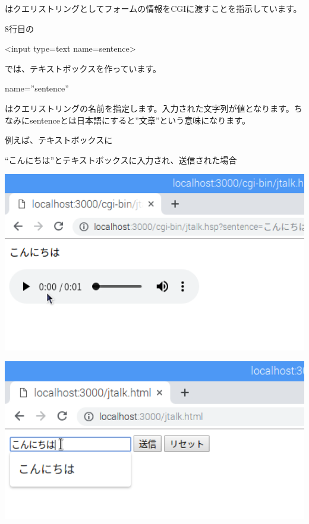 \documentclass[a4paper,12pt,dvipdfmx]{jarticle}
\begin{document}
はクエリストリングとしてフォームの情報をCGIに渡すことを指示しています。

8行目の

{\textless}input type={\textquotedbl}text{\textquotedbl} name={\textquotedbl}sentence{\textquotedbl}{\textgreater}

では、テキストボックスを作っています。

name=”sentence”

はクエリストリングの名前を指定します。入力された文字列が値となります。ちなみにsentenceとは日本語にすると”文章”という意味になります。

例えば、テキストボックスに

“こんにちは”とテキストボックスに入力され、送信された場合

\clearpage
\bigskip



\centering
\includegraphics[width=14.392cm]{ome7-img057.png}

\centering
\includegraphics[width=14.319cm]{ome7-img056.png}
\flushleft


\bigskip

%
\end{document}
